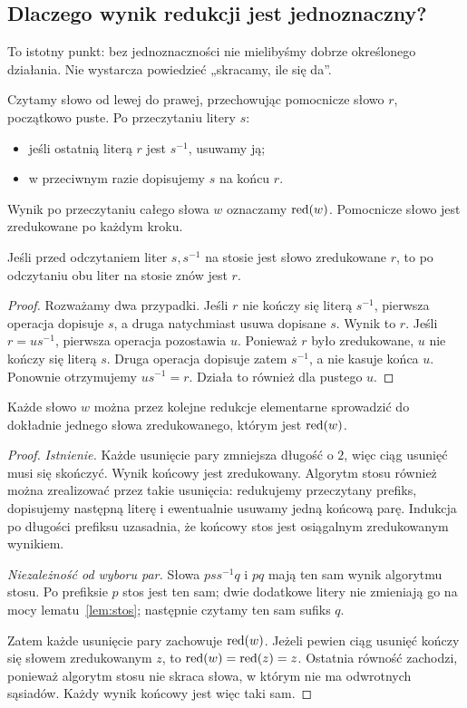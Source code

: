 \subsection{Dlaczego wynik redukcji jest jednoznaczny?}
To istotny punkt: bez jednoznaczności nie mielibyśmy dobrze określonego działania. Nie wystarcza powiedzieć „skracamy, ile się da”.
\begin{definicja}
Czytamy słowo od lewej do prawej, przechowując pomocnicze słowo $r$, początkowo puste. Po przeczytaniu litery $s$:
\begin{itemize}
\item jeśli ostatnią literą $r$ jest $s^{-1}$, usuwamy ją;
\item w przeciwnym razie dopisujemy $s$ na końcu $r$.
\end{itemize}
Wynik po przeczytaniu całego słowa $w$ oznaczamy $\operatorname{red}(w)$. Pomocnicze słowo jest zredukowane po każdym kroku.
\end{definicja}
\begin{lemat}\label{lem:stos}
Jeśli przed odczytaniem liter $s,s^{-1}$ na stosie jest słowo zredukowane $r$, to po odczytaniu obu liter na stosie znów jest $r$.
\end{lemat}
\begin{proof}
Rozważamy dwa przypadki. Jeśli $r$ nie kończy się literą $s^{-1}$, pierwsza operacja dopisuje $s$, a druga natychmiast usuwa dopisane $s$. Wynik to $r$. Jeśli $r=us^{-1}$, pierwsza operacja pozostawia $u$. Ponieważ $r$ było zredukowane, $u$ nie kończy się literą $s$. Druga operacja dopisuje zatem $s^{-1}$, a nie kasuje końca $u$. Ponownie otrzymujemy $us^{-1}=r$. Działa to również dla pustego $u$.
\end{proof}
\begin{twierdzenie}\label{tw:redukcja}
Każde słowo $w$ można przez kolejne redukcje elementarne sprowadzić do dokładnie jednego słowa zredukowanego, którym jest $\operatorname{red}(w)$.
\end{twierdzenie}
\begin{proof}
\emph{Istnienie.} Każde usunięcie pary zmniejsza długość o $2$, więc ciąg usunięć musi się skończyć. Wynik końcowy jest zredukowany. Algorytm stosu również można zrealizować przez takie usunięcia: redukujemy przeczytany prefiks, dopisujemy następną literę i ewentualnie usuwamy jedną końcową parę. Indukcja po długości prefiksu uzasadnia, że końcowy stos jest osiągalnym zredukowanym wynikiem.

\emph{Niezależność od wyboru par.} Słowa $pss^{-1}q$ i $pq$ mają ten sam wynik algorytmu stosu. Po prefiksie $p$ stos jest ten sam; dwie dodatkowe litery nie zmieniają go na mocy lematu~\ref{lem:stos}; następnie czytamy ten sam sufiks $q$.

Zatem każde usunięcie pary zachowuje $\operatorname{red}(w)$. Jeżeli pewien ciąg usunięć kończy się słowem zredukowanym $z$, to $\operatorname{red}(w)=\operatorname{red}(z)=z$. Ostatnia równość zachodzi, ponieważ algorytm stosu nie skraca słowa, w którym nie ma odwrotnych sąsiadów. Każdy wynik końcowy jest więc taki sam.
\end{proof}
